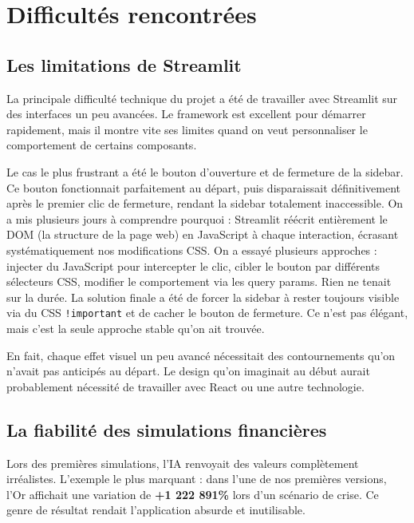 \documentclass[a4paper, 12pt, twoside]{article}
\begin{document}
\newpage

\section{Difficultés rencontrées}

\subsection{Les limitations de Streamlit}

La principale difficulté technique du projet a été de travailler avec Streamlit sur
des interfaces un peu avancées. Le framework est excellent pour démarrer rapidement,
mais il montre vite ses limites quand on veut personnaliser le comportement de
certains composants.

Le cas le plus frustrant a été le bouton d'ouverture et de fermeture de la sidebar.
Ce bouton fonctionnait parfaitement au départ, puis disparaissait définitivement
après le premier clic de fermeture, rendant la sidebar totalement inaccessible.
On a mis plusieurs jours à comprendre pourquoi : Streamlit réécrit entièrement le
DOM (la structure de la page web) en JavaScript à chaque interaction, écrasant
systématiquement nos modifications CSS. On a essayé plusieurs approches : injecter
du JavaScript pour intercepter le clic, cibler le bouton par différents sélecteurs
CSS, modifier le comportement via les query params. Rien ne tenait sur la durée.
La solution finale a été de forcer la sidebar à rester toujours visible via du CSS
\texttt{!important} et de cacher le bouton de fermeture. Ce n'est pas élégant, mais
c'est la seule approche stable qu'on ait trouvée.

En fait, chaque effet visuel un peu avancé nécessitait des contournements qu'on
n'avait pas anticipés au départ. Le design qu'on imaginait au début aurait
probablement nécessité de travailler avec React ou une autre technologie.

\subsection{La fiabilité des simulations financières}

Lors des premières simulations, l'IA renvoyait des valeurs complètement irréalistes.
L'exemple le plus marquant : dans l'une de nos premières versions, l'Or affichait
une variation de \textbf{+1 222 891\%} lors d'un scénario de crise. Ce genre de
résultat rendait l'application absurde et inutilisable.
\end{document}
